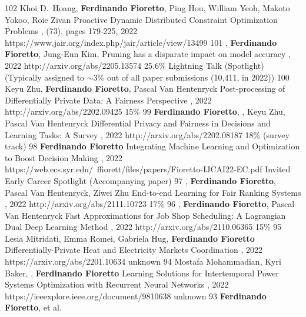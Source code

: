 \begin{pubs}
\journalentry
	{102} %
	{Khoi D.~Hoang, \textbf{Ferdinando Fioretto}, Ping Hou, William Yeoh, Makoto Yokoo, Roie Zivan}
	{Proactive Dynamic Distributed Constraint Optimization Problems}
	{\JAIR, (73), pages 179-225, 2022}
	{https://www.jair.org/index.php/jair/article/view/13499}
\confentryAwd
	{101} %
	{, {\bf Ferdinando Fioretto}, Jung-Eun Kim, 
	}
	{Pruning has a disparate impact on model accuracy}
	{\procNeurIPS, 2022}
	{http://arxiv.org/abs/2205.13574}
	{25.6\%} %
	{Lightning Talk (Spotlight)}
	{(Typically assigned to $\sim$3\% out of all paper submissions (10,411, in 2022))}
\confentry
	{100} %
	{Keyu Zhu, {\bf Ferdinando Fioretto}, Pascal Van Hentenryck}
	{Post-processing of Differentially Private Data: A Fairness Perspective}
	{\procIJCAI, 2022}
	{http://arxiv.org/abs/2202.09425}	
	{15\%}
\confentry
	{99} %
	{{\bf Ferdinando Fioretto}, , Keyu Zhu, Pascal Van Hentenryck}
	{Differential Privacy and Fairness in Decisions and Learning Tasks: A Survey}
	{\procIJCAI, 2022}
	{http://arxiv.org/abs/2202.08187}	
	{18\% (survey track)}
\confentryAwd
	{98} %
	{{\bf Ferdinando Fioretto}}
	{Integrating Machine Learning and Optimization to Boost Decision Making}
	{\procIJCAI, 2022}
	{https://web.ecs.syr.edu/~ffiorett/files/papers/Fioretto-IJCAI22-EC.pdf}	
	{Invited}
	{Early Career Spotlight}
	{(Accompanying paper)}
\confentry
	{97} %
	{, {\bf Ferdinando Fioretto}, Pascal Van Hentenryck, Ziwei Zhu}
	{End-to-end Learning for Fair Ranking Systems}
	{\procWWW, 2022}
	{http://arxiv.org/abs/2111.10723}	
	{17\%}	
\confentry
	{96} %
	{, {\bf Ferdinando Fioretto}, Pascal Van Hentenryck}
	{Fast Approximations for Job Shop Scheduling: A Lagrangian Dual Deep Learning Method}
	{\procAAAI, 2022}
	{http://arxiv.org/abs/2110.06365}
	{15\%}
\confentry
	{95} %
	{Lesia Mitridati, Emma Romei, Gabriela Hug, {\bf Ferdinando Fioretto}}
	{Differentially-Private Heat and Electricity Markets Coordination}
	{\procPMAPS, 2022}
	{https://arxiv.org/abs/2201.10634}
	{unknown} 
\confentry
	{94} %
	{Mostafa Mohammadian, Kyri Baker, , {\bf Ferdinando Fioretto}}
	{Learning Solutions for Intertemporal Power Systems Optimization with Recurrent Neural Networks}
	{\procPMAPS, 2022}
	{https://ieeexplore.ieee.org/document/9810638}
	{unknown}
\journalentry
	{93} %
	{{\bf Ferdinando Fioretto}, et al.} 

\end{pubs}
